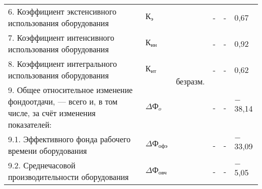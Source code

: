\begin{table}[h!]
{\begin{tabular}{| p{} | p{} | p{} | p{} | p{} | p{} |}
      6. Коэффициент экстенсивного использования оборудования & $ \text{К}_{\text{э}} $ & \multirow{5}{*}{безразм.} & - & - & 0,67 \\ \cline{1-2}\cline{4-6}

      7. Коэффициент интенсивного использования оборудования & $ \text{К}_{\text{ин}} $ & & - & - & 0,92 \\ \cline{1-2}\cline{4-6}

      8. Коэффициент интегрального использования оборудования & $ \text{К}_{\text{ит}} $ & & - & - & 0,62 \\ \hline

      9. Общее относительное изменение фондоотдачи, --- всего и, в том числе, за счёт изменения показателей: & $ \Delta \text{Ф}_o $ & \multirow{6}{*}{\%} & - & - & $-$38,14 \\ \cline{1-2}\cline{4-6}

      9.1. Эффективного фонда рабочего времени оборудования & $ \Delta \text{Ф}_{\text{офэ}} $ & & - & - & $-$33,09 \\ \cline{1-2}\cline{4-6}

      9.2. Среднечасовой производительности оборудования & $ \Delta \text{Ф}_{\text{овч}} $ & & - & - & $-$5,05 \\ \hline
    \end{tabular}
  }
\end{table}


\newpage
